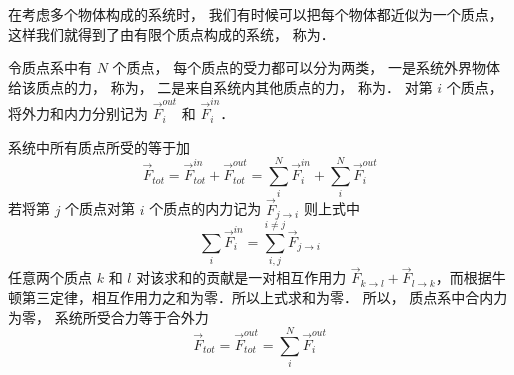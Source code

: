 

在考虑多个物体构成的系统时， 我们有时候可以把每个物体都近似为一个质点， 这样我们就得到了由有限个质点构成的系统， 称为．

令质点系中有 $N$ 个质点， 每个质点的受力都可以分为两类， 一是系统外界物体给该质点的力， 称为， 二是来自系统内其他质点的力， 称为． 对第 $i$ 个质点， 将外力和内力分别记为 $\vec F_i^{out}$ 和 $\vec F_i^{in}$． 

系统中所有质点所受的等于加
\begin{equation}
\vec F_{tot} = \vec F_{tot}^{in} + \vec F_{tot}^{out} = \sum_i^N \vec F_i^{in} + \sum_i^N \vec F_i^{out}
\end{equation}
若将第 $j$ 个质点对第 $i$ 个质点的内力记为 $\vec F_{j\to i}$ 则上式中
\begin{equation}
\sum_i \vec F_i^{in} = \sum_{i,j}^{i \ne j} \vec F_{j \to i}
\end{equation}
任意两个质点 $k$ 和 $l$ 对该求和的贡献是一对相互作用力 $\vec F_{k \to l} + \vec F_{l \to k}$，而根据牛顿第三定律，相互作用力之和为零．所以上式求和为零． 所以， 质点系中合内力为零， 系统所受合力等于合外力
\begin{equation}
\vec F_{tot} = \vec F_{tot}^{out} = \sum_i^N \vec F_i^{out}
\end{equation}